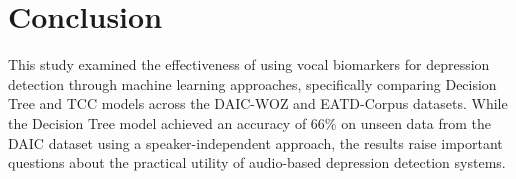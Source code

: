 
\section{Conclusion}
This study examined the effectiveness of using vocal biomarkers for depression detection through machine learning approaches, specifically comparing Decision Tree and TCC models across the DAIC-WOZ and EATD-Corpus datasets. While the Decision Tree model achieved an accuracy of 66\% on unseen data from the DAIC dataset using a speaker-independent approach, the results raise important questions about the practical utility of audio-based depression detection systems.

